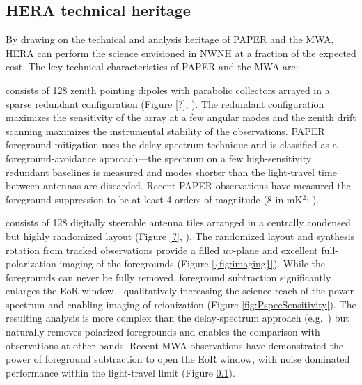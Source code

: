 \documentclass[preprint]{aastex}
\begin{document}
\subsection{HERA technical heritage}
By drawing on the technical and analysis heritage of PAPER and the MWA, HERA can perform the science envisioned in NWNH at a fraction of the expected cost. The key technical characteristics of PAPER and the MWA are:

 consists of 128 zenith pointing dipoles with parabolic collectors arrayed in a sparse redundant configuration (Figure \ref{?}, \citealt{?}). The redundant configuration maximizes the sensitivity of the array at a few angular modes and the zenith drift scanning maximizes the instrumental stability of the observations.  PAPER foreground mitigation uses the delay-spectrum technique and is classified as a foreground-avoidance approach---the spectrum on a few high-sensitivity redundant baselines is measured and modes shorter than the light-travel time between antennas are discarded. Recent PAPER observations
have measured the foreground suppression
to be at least 4 orders of magnitude 
(8 in mK$^2$;
\citealt{parsons_et_al2013}).

 consists of 128 digitally steerable antenna tiles arranged in a centrally condensed but highly randomized layout (Figure \ref{?}, \citealt{Tingay}). The randomized layout and synthesis rotation from tracked observations provide a filled $uv$-plane and excellent full-polarization imaging of the foregrounds (Figure \ref{{fig:imaging}}). While the foregrounds can never be fully removed, foreground subtraction significantly enlarges the EoR window---qualitatively increasing the science reach of the power spectrum and enabling imaging of reionization (Figure \ref{fig:PspecSensitivity}). The resulting analysis is more complex than the  delay-spectrum approach (e.g.\ \citealt{hazelton_et_al2013}) but naturally removes polarized foregrounds \citep{Moore} and enables the comparison with observations at other bands. Recent MWA observations have demonstrated the power of foreground subtraction to open the EoR window, with noise dominated performance within the light-travel limit (Figure \ref{}).
\end{document}
